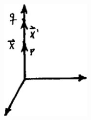 \documentclass[10pt,oneside]{CBFT_book}
\begin{document}
\begin{figure}[htb]
	\begin{center}
	\includegraphics[width=0.4\textwidth]{images/fig_ft1_armesf2.pdf}	 
	\end{center}
	\caption{}
\end{figure} 



\end{document}
